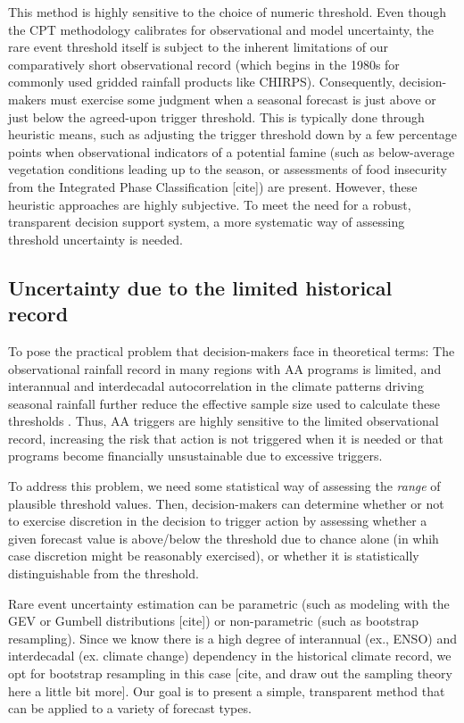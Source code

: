 \documentclass{ametsocV5}
\begin{document}
This method is highly sensitive to the choice of numeric threshold. Even though the CPT methodology calibrates for observational and model uncertainty, the rare event threshold itself is subject to the inherent limitations of our comparatively short observational record (which begins in the 1980s for commonly used gridded rainfall products like CHIRPS). Consequently, decision-makers must exercise some judgment when a seasonal forecast is just above or just below the agreed-upon trigger threshold. This is typically done through heuristic means, such as adjusting the trigger threshold down by a few percentage points when observational indicators of a potential famine (such as below-average vegetation conditions leading up to the season, or assessments of food insecurity from the Integrated Phase Classification [cite]) are present. However, these heuristic approaches are highly subjective. To meet the need for a robust, transparent decision support system, a more systematic way of assessing threshold uncertainty is needed. 

\subsection{Uncertainty due to the limited historical record}

To pose the practical problem that decision-makers face in theoretical terms: The observational rainfall record in many regions with AA programs is limited, and interannual and interdecadal autocorrelation in the climate patterns driving seasonal rainfall further reduce the effective sample size used to calculate these thresholds \citep{martinez_seasonal_2022}. Thus, AA triggers are highly sensitive to the limited observational record, increasing the risk that action is not triggered when it is needed or that programs become financially unsustainable due to excessive triggers. 

To address this problem, we need some statistical way of assessing the \textit{range} of plausible threshold values. Then, decision-makers can determine whether or not to exercise discretion in the decision to trigger action by assessing whether a given forecast value is above/below the threshold due to chance alone (in whih case discretion might be reasonably exercised), or whether it is statistically distinguishable from the threshold.

Rare event uncertainty estimation can be parametric (such as modeling with the GEV or Gumbell distributions [cite]) or non-parametric (such as bootstrap resampling). Since we know there is a high degree of interannual (ex., ENSO) and interdecadal (ex. climate change) dependency in the historical climate record, we opt for bootstrap resampling in this case [cite, and draw out the sampling theory here a little bit more]. Our goal is to present a simple, transparent method that can be applied to a variety of forecast types. 
\end{document}
